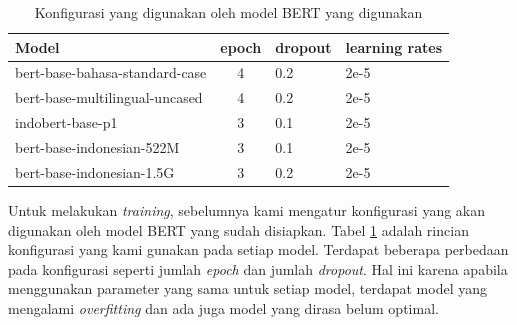 \begin{table}[h]
    \centering
    \caption{Konfigurasi yang digunakan oleh model BERT yang digunakan}
    \label{tab:multi_bert_config}
    \begin{tabular}{|p{.5\linewidth}|c|l|p{.12\linewidth} |}
        \hline
        Model                          & epoch & dropout & learning rates \\ \hline
        bert-base-bahasa-standard-case & 4     & 0.2     & 2e-5           \\ \hline
        bert-base-multilingual-uncased & 4     & 0.2     & 2e-5           \\ \hline
        indobert-base-p1               & 3     & 0.1     & 2e-5           \\ \hline
        bert-base-indonesian-522M      & 3     & 0.1     & 2e-5           \\ \hline
        bert-base-indonesian-1.5G      & 3     & 0.2     & 2e-5           \\ \hline
    \end{tabular}
\end{table}

Untuk melakukan \textit{training}, sebelumnya kami mengatur konfigurasi yang akan digunakan oleh model BERT yang sudah disiapkan. Tabel \ref{tab:multi_bert_config} adalah rincian konfigurasi yang kami gunakan pada setiap model. Terdapat beberapa perbedaan pada konfigurasi seperti jumlah \textit{epoch} dan jumlah \textit{dropout}. Hal ini karena apabila menggunakan parameter yang sama untuk setiap model, terdapat model yang mengalami \textit{overfitting} dan ada juga model yang dirasa belum optimal.

